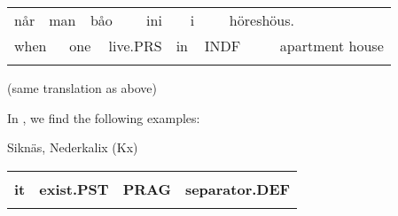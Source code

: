 \begin{tabular}{llllllllllll}
\lsptoprule
når & \multicolumn{2}{l}{man

} & \multicolumn{2}{l}{båo 

} & \multicolumn{2}{l}{ini

} & \multicolumn{2}{l}{i

} & \multicolumn{2}{l}{höreshöus.

} & \\
\multicolumn{2}{l}{when

} & \multicolumn{2}{l}{one

} & \multicolumn{2}{l}{live.PRS

} & \multicolumn{2}{l}{in

} & \multicolumn{2}{l}{INDF

} & \multicolumn{2}{l}{apartment house

}\\
\lspbottomrule
\end{tabular}

\begin{styleTranslation}
(same translation as above)

\end{styleTranslation}

\begin{styleBodyTextFirst}
In \citet{Stenberg1971}, we find the following examples:

\end{styleBodyTextFirst}


\begin{listWWNumileveli}
\item 

\begin{styleExample}
Siknäs, Nederkalix (Kx)

\end{styleExample}

\end{listWWNumileveli}

\begin{listWWNumxlvleveli}
\item 

\end{listWWNumxlvleveli}

\begin{tabular}{llll}
\lsptoprule
\multicolumn{4}{l}{{\bfseries He}

}\\
{\bfseries it} & {\bfseries exist.PST} & {\bfseries PRAG} & {\bfseries separator.DEF}\\
\lspbottomrule
\end{tabular}

